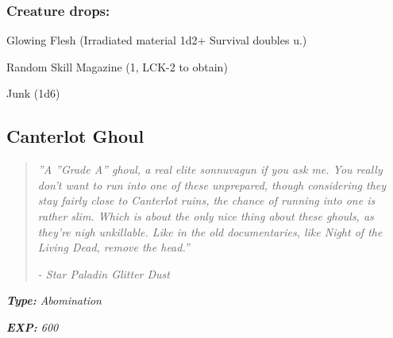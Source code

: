 \documentclass[11pt,a4paper,twocolumn]{book}
\begin{document}
	
	\subsubsection*{Creature drops:}
	\begin{compactitem}
		\item Glowing Flesh (Irradiated material 1d2+ Survival doubles u.)
		\item Random Skill Magazine (1, LCK-2 to obtain)
		\item Junk (1d6)
	\end{compactitem}

	\subsection*{Canterlot Ghoul}
\begin{quote}
	\emph{''A ''Grade A'' ghoul, a real elite sonnuvagun if you ask me. You really don't want to run into one of these unprepared, though considering they stay fairly close to Canterlot ruins, the chance of running into one is rather slim. Which is about the only nice thing about these ghouls, as they're nigh unkillable. Like in the old documentaries, like Night of the Living Dead, remove the head.''}
	
	\emph{-	Star Paladin Glitter Dust}
\end{quote}

\noindent
\emph{\textbf{Type:} Abomination}

\noindent
\emph{\textbf{EXP:} 600}
\end{document}

